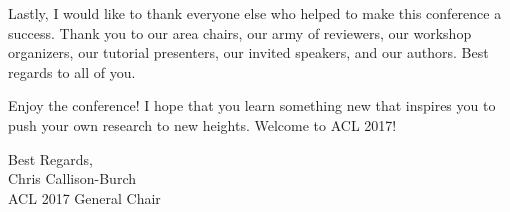 Lastly, I would like to thank everyone else who helped to make this conference a success.  Thank you to our area chairs, our army of reviewers, our workshop organizers, our tutorial presenters, our invited speakers, and our authors.  Best regards to all of you.

Enjoy the conference! I hope that you learn something new that inspires you to
push your own research to new heights.  
Welcome to ACL 2017!  


\vskip 0.5in
\noindent Best Regards,\\
Chris Callison-Burch\\
ACL 2017 General Chair


